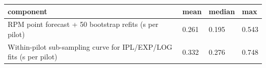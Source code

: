 \begin{tabular}{llll}
\hline
component & mean & median & max \\
\hline
RPM point forecast + 50 bootstrap refits (s per pilot) & 0.261 & 0.195 & 0.543 \\
Within-pilot sub-sampling curve for IPL/EXP/LOG fits (s per pilot) & 0.332 & 0.276 & 0.748 \\
\hline
\end{tabular}

